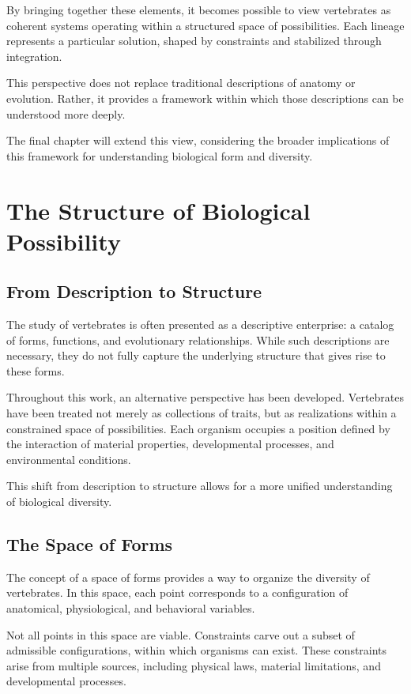 \documentclass[11pt,oneside]{book}
\begin{document}
By bringing together these elements, it becomes possible to view vertebrates as coherent systems operating within a structured space of possibilities. Each lineage represents a particular solution, shaped by constraints and stabilized through integration.

This perspective does not replace traditional descriptions of anatomy or evolution. Rather, it provides a framework within which those descriptions can be understood more deeply.

The final chapter will extend this view, considering the broader implications of this framework for understanding biological form and diversity.

\chapter{The Structure of Biological Possibility}

\section{From Description to Structure}

The study of vertebrates is often presented as a descriptive enterprise: a catalog of forms, functions, and evolutionary relationships. While such descriptions are necessary, they do not fully capture the underlying structure that gives rise to these forms.

Throughout this work, an alternative perspective has been developed. Vertebrates have been treated not merely as collections of traits, but as realizations within a constrained space of possibilities. Each organism occupies a position defined by the interaction of material properties, developmental processes, and environmental conditions.

This shift from description to structure allows for a more unified understanding of biological diversity.

\section{The Space of Forms}

The concept of a space of forms provides a way to organize the diversity of vertebrates. In this space, each point corresponds to a configuration of anatomical, physiological, and behavioral variables.

Not all points in this space are viable. Constraints carve out a subset of admissible configurations, within which organisms can exist. These constraints arise from multiple sources, including physical laws, material limitations, and developmental processes.
\end{document}

